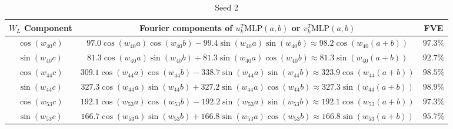 \documentclass{article} %
\newcommand{\cosp}[1]{\cos \left ( #1 \right )}
\newcommand{\sinp}[1]{\sin \left ( #1 \right )}
\newcommand{\MLP}{\textrm{MLP}}
\begin{document}
\begin{table}[]
    \begin{subtable}{1\textwidth}
    \centering
        \begin{tabular}{c|c|c}
         $W_{L}$ Component & Fourier components of $u_k^T \MLP(a,b)$ or $v_k^T \MLP(a,b)$& FVE\\
         \hline 
        $\cosp{w_{40}c}$ & $97.0 \cosp{w_{40}a}\cosp{w_{40}b} -99.4 \sinp{w_{40}a}\sinp{w_{40}b}\approx 98.2  \cosp{w_{40}(a+b)} $& $97.3 \%$ \\
$\sinp{w_{40}c}$ & $81.3 \cosp{w_{40}a}\sinp{w_{40}b} + 81.3 \sinp{w_{40}a}\cosp{w_{40}b}\approx 81.3  \sinp{w_{40}(a+b)} $& $92.7 \%$ \\
$\cosp{w_{44}c}$ & $309.1 \cosp{w_{44}a}\cosp{w_{44}b} -338.7 \sinp{w_{44}a}\sinp{w_{44}b}\approx 323.9  \cosp{w_{44}(a+b)} $& $98.5 \%$ \\
$\sinp{w_{44}c}$ & $327.3 \cosp{w_{44}a}\sinp{w_{44}b} + 327.2 \sinp{w_{44}a}\cosp{w_{44}b}\approx 327.3  \sinp{w_{44}(a+b)} $& $98.9 \%$ \\
$\cosp{w_{53}c}$ & $192.1 \cosp{w_{53}a}\cosp{w_{53}b} -192.2 \sinp{w_{53}a}\sinp{w_{53}b}\approx 192.1  \cosp{w_{53}(a+b)} $& $97.3 \%$ \\
$\sinp{w_{53}c}$ & $166.7 \cosp{w_{53}a}\sinp{w_{53}b} + 166.8 \sinp{w_{53}a}\cosp{w_{53}b}\approx 166.8  \sinp{w_{53}(a+b)} $& $95.7 \%$ \\
    \end{tabular}
    \caption{Seed 2}
    \end{subtable}
    

\end{table}
\end{document}
